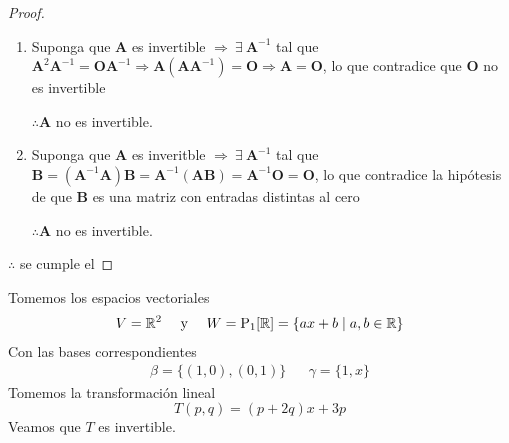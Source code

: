\begin{proof}
\begin{enumerate}
    \item Suponga que $\textbf{A}$ es invertible $\Rightarrow \: \exists \: {\textbf{A}}^{-1} $ tal que $ \textbf{A}^2{\textbf{A}}^{-1}=\textbf{O}{\textbf{A}}^{-1} \Rightarrow \textbf{A}(\textbf{A}{\textbf{A}}^{-1})=\textbf{O} \Rightarrow \textbf{A}=\textbf{O}$, lo que contradice que $\textbf{O}$ no es invertible
    
    $\therefore \textbf{A}$ no es invertible.

    \item Suponga que $\textbf{A}$ es inveritble $\Rightarrow \: \exists\:  {\textbf{A}}^{-1}$ tal que $\textbf{B}=({\textbf{A}}^{-1}\textbf{A})\textbf{B}={\textbf{A}}^{-1}(\textbf{AB})={\textbf{A}}^{-1}\textbf{O}=\textbf{O}$, lo que contradice la hipótesis de que $\textbf{B}$ es una matriz con entradas distintas al cero
    
    $\therefore \textbf{A}$ no es invertible. 
\end{enumerate}
 $\therefore$ se cumple el 
\end{proof}


\begin{eg}
    Tomemos los espacios vectoriales
    \begin{align*}
      V = \mathbb{R}^2 && \text{ y } && W = \mathrm{P}_1 [\mathbb{R}] = \{ ax + b \mid a,b \in \mathbb{R} \}
    \end{align*}
    Con las bases correspondientes 
    \begin{align*}
     \beta = \{ (1,0), (0,1) \} && \gamma = \{ 1, x \}
    \end{align*}
    Tomemos la transformación lineal
    $$T(p,q) = (p + 2q)x + 3p$$
    Veamos que $T$ es invertible. 
    \end{eg}

